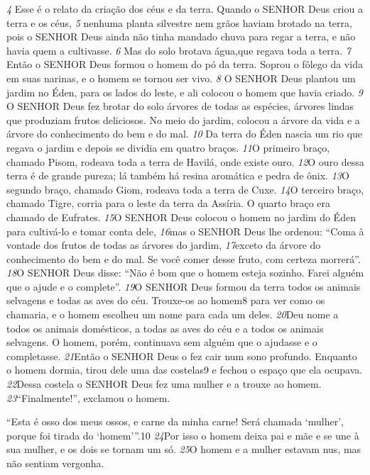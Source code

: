 \bigskip
\textit{\tiny 4}
Esse é o relato da criação dos céus e da terra. Quando o SENHOR Deus criou a terra e os céus, 
\textit{\tiny 5}
nenhuma planta silvestre nem grãos haviam brotado na terra, pois o SENHOR Deus ainda não tinha mandado
chuva para regar a terra, e não havia quem a cultivasse. 
\textit{\tiny 6}
Mas do solo brotava água,que regava toda a terra. 
\textit{\tiny 7}
Então o SENHOR Deus formou o homem do pó da
terra. Soprou o fôlego da vida em suas narinas, e o homem se tornou ser vivo.
\textit{\tiny 8}
O SENHOR Deus plantou um jardim no Éden, para os lados do leste, e ali
colocou o homem que havia criado. 
\textit{\tiny 9}
O SENHOR Deus fez brotar do solo árvores de
todas as espécies, árvores lindas que produziam frutos deliciosos. No meio do
jardim, colocou a árvore da vida e a árvore do conhecimento do bem e do mal.
\textit{\tiny 10}
Da terra do Éden nascia um rio que regava o jardim e depois se dividia em
quatro braços.  
\textit{\tiny 11}O primeiro braço, chamado Pisom, rodeava toda a terra de
Havilá, onde existe ouro.  
\textit{\tiny 12}O ouro dessa terra é de grande pureza; lá também há
resina aromática e pedra de ônix.  
\textit{\tiny 13}O segundo braço, chamado Giom, rodeava
toda a terra de Cuxe. 
\textit{\tiny 14}O terceiro braço, chamado Tigre, corria para o leste da
terra da Assíria. O quarto braço era chamado de Eufrates.
\textit{\tiny 15}O SENHOR Deus colocou o homem no jardim do Éden para cultivá-lo e tomar
conta dele,  
\textit{\tiny 16}mas o SENHOR Deus lhe ordenou: “Coma à vontade dos frutos de
todas as árvores do jardim,  
\textit{\tiny 17}exceto da árvore do conhecimento do bem e do mal.
Se você comer desse fruto, com certeza morrerá”.
\textit{\tiny 18}O SENHOR Deus disse: “Não é bom que o homem esteja sozinho. Farei alguém
que o ajude e o complete”.  
\textit{\tiny 19}O SENHOR Deus formou da terra todos os animais
selvagens e todas as aves do céu. Trouxe-os ao homem8 para ver como os
chamaria, e o homem escolheu um nome para cada um deles.  
\textit{\tiny 20}Deu nome a todos
os animais domésticos, a todas as aves do céu e a todos os animais selvagens. O
homem, porém, continuava sem alguém que o ajudasse e o completasse.
\textit{\tiny 21}Então o SENHOR Deus o fez cair num sono profundo. Enquanto o homem
dormia, tirou dele uma das costelas9 e fechou o espaço que ela ocupava.  
\textit{\tiny 22}Dessa
costela o SENHOR Deus fez uma mulher e a trouxe ao homem.
\textit{\tiny 23}“Finalmente!”, exclamou o homem.

    “Esta é osso dos meus ossos,
      e carne da minha carne!
    Será chamada ‘mulher’,
      porque foi tirada do ‘homem’”.10
\textit{\tiny 24}Por   isso o homem deixa pai e mãe e se une à sua mulher, e os dois se tornam
um só.
\textit{\tiny 25}O homem e a mulher estavam nus, mas não sentiam vergonha.

